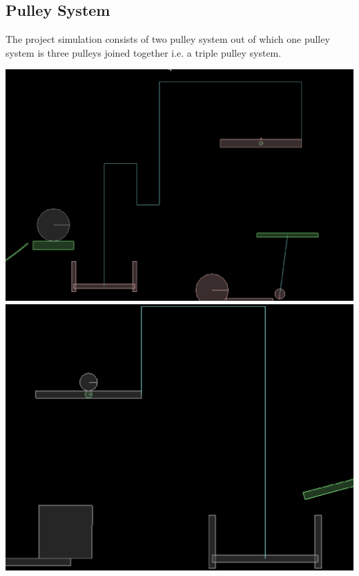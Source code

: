 \documentclass[11pt]{article}
\begin{document}
\subsection{Pulley System}
The project simulation consists of two pulley system out of which one pulley system is three pulleys joined together i.e. a triple pulley system.
\begin{center}
\includegraphics[scale=0.5]{pulley1}
\includegraphics[scale=0.5]{pulley2}
\end{center}
\end{document}
